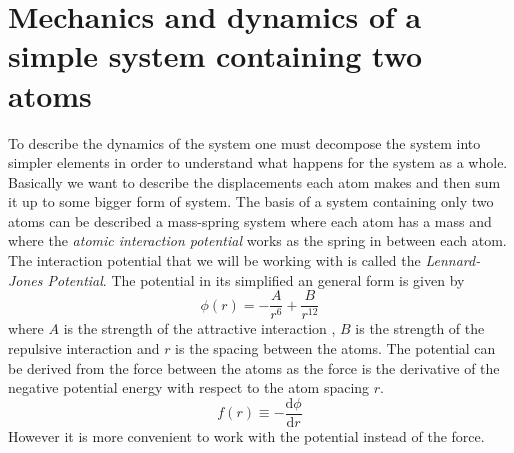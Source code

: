 
\appendix
\appendixpage
\addappheadtotoc
\section{Mechanics and dynamics of a simple system containing two atoms}\label{Simplemec}
To describe the dynamics of the system one must decompose the system into simpler elements in order to understand what happens for the system as a whole. Basically we want to describe the displacements each atom makes and then sum it up to some bigger form of system. The basis of a system containing only two atoms can be described a mass-spring system where each atom has a mass and where the \textit{atomic interaction potential} works as the spring in between each atom. The interaction potential that we will be working with is called the \textit{Lennard-Jones Potential}. The potential in its simplified an general form is given by \begin{equation}
    \phi(r)=-\dfrac{A}{r^{6}}+\dfrac{B}{r^{12}}\label{LJPot}
\end{equation} where $A$ is the strength of the attractive interaction , $B$ is the strength of the repulsive interaction and $r$ is the spacing between the atoms.
The potential can be derived from the force between the atoms as the force is the derivative of the negative potential energy with respect to the atom spacing $r$.\begin{equation}
    f(r)\equiv -\dfrac{\text{d}\phi}{\text{d}r}
\end{equation} However it is more convenient to work with the potential instead of the force. \\
